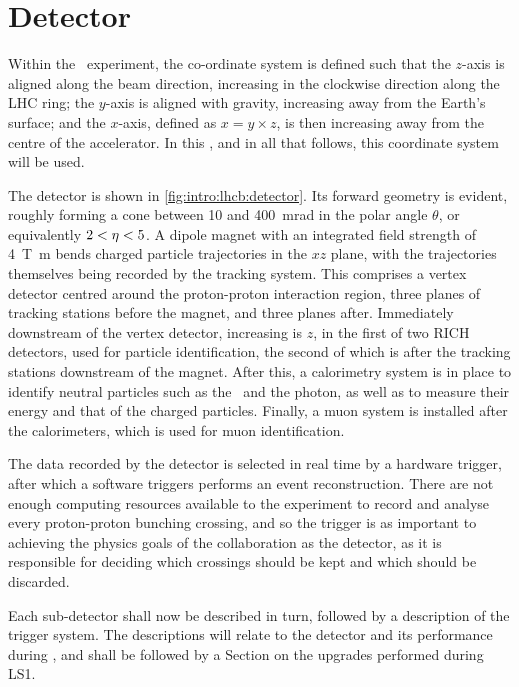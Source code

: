 \section{Detector}
\label{chap:intro:lhcb:detector}

Within the \lhcb\ experiment, the co-ordinate system is defined such that the 
$z$-axis is aligned along the beam direction, increasing in the clockwise 
direction along the \ac{LHC} ring; the $y$-axis is aligned with gravity, 
increasing away from the Earth's surface; and the $x$-axis, defined as $x = y 
\times z$, is then increasing away from the centre of the accelerator.
In this , and in all that follows, this 
coordinate system will be used.

The detector is shown in \cref{fig:intro:lhcb:detector}.
Its forward geometry is evident, roughly forming a cone between 10 and 
\SI{400}{\milli\radian} in the polar angle $\theta$, or equivalently $2 < \eta 
< 5$.
A dipole magnet with an integrated field strength of \SI{4}{\tesla\metre} bends 
charged particle trajectories in the $xz$ plane, with the trajectories 
themselves being recorded by the tracking system.
This comprises a vertex detector centred around the proton-proton interaction 
region, three planes of tracking stations before the magnet, and three planes 
after.
Immediately downstream of the vertex detector, increasing is $z$, in the first 
of two \ac{RICH} detectors, used for particle identification, the second of 
which is after the tracking stations downstream of the magnet.
After this, a calorimetry system is in place to identify neutral particles such 
as the \Ppizero\ and the photon, as well as to measure their energy and that of 
the charged particles.
Finally, a muon system is installed after the calorimeters, which is used for 
muon identification.

The data recorded by the detector is selected in real time by a hardware 
trigger, after which a software triggers performs an event reconstruction.
There are not enough computing resources available to the experiment to record 
and analyse every proton-proton bunching crossing, and so the trigger is as 
important to achieving the physics goals of the collaboration as the detector, 
as it is responsible for deciding which crossings should be kept and which 
should be discarded.

Each sub-detector shall now be described in turn, followed by a description of 
the trigger system.
The descriptions will relate to the detector and its performance during 
\runone, and shall be followed by a Section on the upgrades performed during 
\ac{LS1}.


